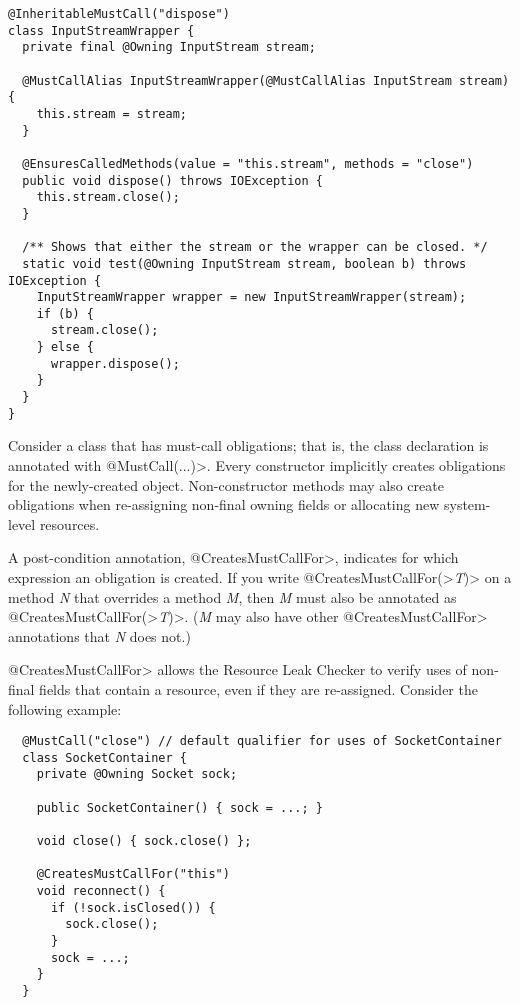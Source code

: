 \begin{verbatim}
@InheritableMustCall("dispose")
class InputStreamWrapper {
  private final @Owning InputStream stream;

  @MustCallAlias InputStreamWrapper(@MustCallAlias InputStream stream) {
    this.stream = stream;
  }

  @EnsuresCalledMethods(value = "this.stream", methods = "close")
  public void dispose() throws IOException {
    this.stream.close();
  }

  /** Shows that either the stream or the wrapper can be closed. */
  static void test(@Owning InputStream stream, boolean b) throws IOException {
    InputStreamWrapper wrapper = new InputStreamWrapper(stream);
    if (b) {
      stream.close();
    } else {
      wrapper.dispose();
    }
  }
}
\end{verbatim}



Consider a class that has must-call obligations; that is, the class
declaration is annotated with \<@MustCall(...)>.
Every constructor implicitly creates obligations for the newly-created object.
Non-constructor methods may also create obligations
when re-assigning non-final owning fields or allocating
new system-level resources.

A post-condition annotation,
\<@CreatesMustCallFor>,
indicates for which expression an obligation is created.
If you write \<@CreatesMustCallFor(>\emph{T}\<)> on a method \emph{N} that
overrides a method \emph{M}, then \emph{M} must also be annotated as
\<@CreatesMustCallFor(>\emph{T}\<)>.  (\emph{M} may also have other
\<@CreatesMustCallFor> annotations that \emph{N} does not.)

\<@CreatesMustCallFor> allows the Resource Leak Checker to verify uses of non-final fields
that contain a resource, even if they are re-assigned. Consider
the following example:

\begin{verbatim}
  @MustCall("close") // default qualifier for uses of SocketContainer
  class SocketContainer {
    private @Owning Socket sock;

    public SocketContainer() { sock = ...; }

    void close() { sock.close() };

    @CreatesMustCallFor("this")
    void reconnect() {
      if (!sock.isClosed()) {
        sock.close();
      }
      sock = ...;
    }
  }
\end{verbatim}

